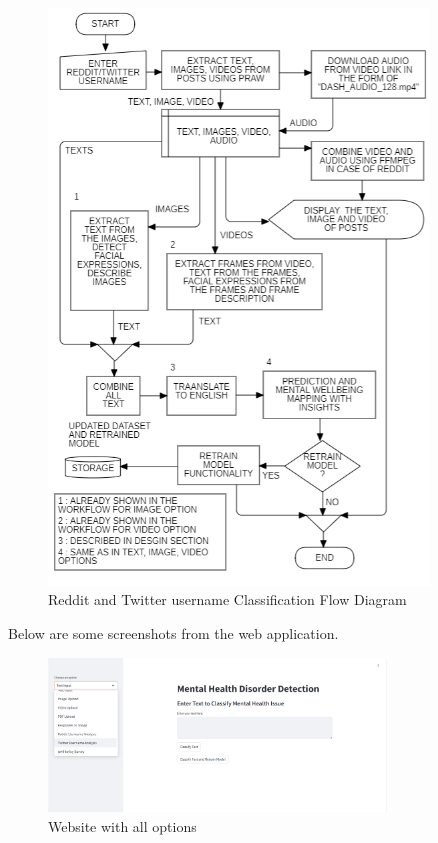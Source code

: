 \pagebreak
\begin{figure}[h!]  
    \centering
    \includegraphics[width=0.9\textwidth]{Images/APP REDDIT.png}  
    \caption{Reddit and Twitter username Classification Flow Diagram}
    \label{01234i}  %
\end{figure}












\pagebreak
\noindent
Below are some screenshots from the web application.

\begin{figure}[h!]  
    \centering
    \includegraphics[width=0.8\textwidth]{App Images/01 Interface.png}  
    \caption{Website with all options}
    \label{01i}  %
\end{figure}


